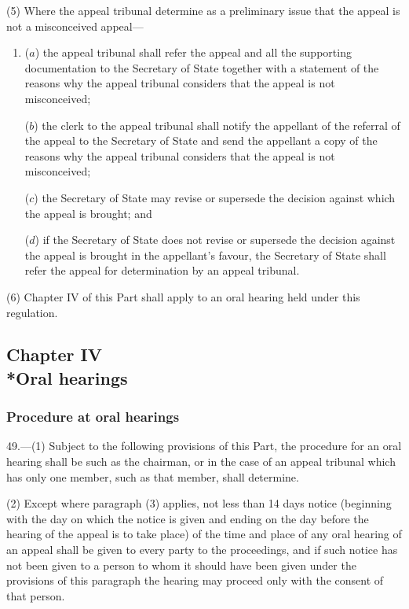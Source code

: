 \documentclass[12pt,a4paper]{article}
\begin{document}
(5) Where the appeal tribunal determine as a preliminary issue that the appeal is not a misconceived appeal—
\begin{enumerate}\item[]
($a$) the appeal tribunal shall refer the appeal and all the supporting documentation to the Secretary of State together with a statement of the reasons why the appeal tribunal considers that the appeal is not misconceived;

($b$) the clerk to the appeal tribunal shall notify the appellant of the referral of the appeal to the Secretary of State and send the appellant a copy of the reasons why the appeal tribunal considers that the appeal is not misconceived;

($c$) the Secretary of State may revise or supersede the decision against which the appeal is brought; and

($d$) if the Secretary of State does not revise or supersede the decision against the appeal is brought in the appellant’s favour, the Secretary of State shall refer the appeal for determination by an appeal tribunal.
\end{enumerate}

(6) Chapter IV of this Part shall apply to an oral hearing held under this regulation.

\subsection[Chapter IV --- Oral hearings]{Chapter IV\\*Oral hearings}

\renewcommand\parthead{--- Part V Chapter IV}

\subsubsection[49. Procedure at oral hearings]{Procedure at oral hearings}

49.—(1) Subject to the following provisions of this Part, the procedure for an oral hearing shall be such as the chairman, or in the case of an appeal tribunal which has only one member, such as that member, shall determine.

(2) Except where paragraph (3) applies, not less than 14 days notice (beginning with the day on which the notice is given and ending on the day before the hearing of the appeal is to take place) of the time and place of any oral hearing of an appeal shall be given to every party to the proceedings, and if such notice has not been given to a person to whom it should have been given under the provisions of this paragraph the hearing may proceed only with the consent of that person.
\end{document}
